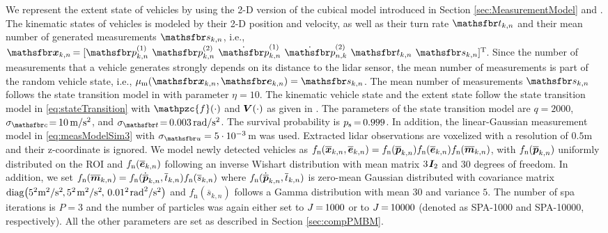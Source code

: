 \documentclass[10pt, twoside, romanappendices]{IEEEtran}
\providecommand{\ist}{\hspace*{.3mm}}
\providecommand{\rmv}{\hspace*{-.3mm}}
\begin{document}
We represent the extent state of vehicles by using the 2-D version of the cubical model introduced in Section \ref{sec:MeasurementModel} and \cite[Section 2]{MeyWil:SM21}. The kinematic states of vehicles is modeled by their  2-D position and velocity, as well as their turn rate $\rv{t}_{k,n}$ and their mean number of generated measurements $\rv{s}_{k,n}$, i.e., $\RV{x}_{k,n} \rmv= [\rv{p}^{(1)}_{k,n} \;\ist \rv{p}^{(2)}_{k,n} \;\ist \dot{\rv{p}}^{(1)}_{k,n} \;\ist \dot{\rv{p}}^{(2)}_{n,k} \;\ist \rv{t}_{k,n}  \;\ist \rv{s}_{k,n}  ]^{\text{T}}\rmv\rmv$. Since the number of measurements that a vehicle generates strongly depends on\vspace{0mm} its distance to the lidar sensor, the mean number of measurements is part of the random vehicle state, i.e., $\mu_{\mathrm{m}}(\RV{x}_{k,n},\RV{e}_{k,n}) = \rv{s}_{k,n}$. The mean number of measurements $\rv{s}_{k,n}$ follows the state transition model in \cite[Table III]{GraFatSve:J19} with parameter $\eta = 10$. The kinematic vehicle state and the extent state follow the state transition model in \eqref{eq:stateTransition} with $\mathpzc{f}(\cdot)$ and  $\M{V}(\cdot)$ as given in \cite{ GraOrg:J14a}. The parameters of the state transition model are  $q = 2000$, $\sigma_{\rv{c}} \!=\rmv 10 \ist\ist \text{m}/\text{s}^2$, and  $\sigma_{\rv{t}} \!=\rmv 0.003 \ist\ist \text{rad}/\text{s}^2$. The survival probability is $p_{\mathrm{s}} \rmv=\rmv 0.999$. In addition, the linear-Gaussian measurement model in \eqref{eq:measModelSim3} with $\sigma_{\rv{u}} = 5 \cdot 10^{-3}\ist$m was used. Extracted lidar observations are voxelized with a resolution of $0.5$m and their z-coordinate is ignored. We model newly detected vehicles as $f_{\mathrm{n}}(\overline{\bm{x}}_{k,n},\overline{\bm{e}}_{k,n})= f_{\mathrm{n}}(\overline{\bm{p}}_{k,n}) f_{\mathrm{n}}(\overline{\bm{e}}_{k,n})  f_{\mathrm{n}}(\overline{\bm{m}}_{k,n})$, with $f_{\mathrm{n}}(\overline{\bm{p}}_{k,n})$ uniformly distributed on the ROI and $f_{\mathrm{n}}(\overline{\bm{e}}_{k,n})$ following an inverse Wishart distribution with mean matrix $3 \ist \M{I}_2$ and $30$ degrees of freedom. In addition, we set $f_{\mathrm{n}}(\overline{\bm{m}}_{k,n}) = f_{\mathrm{n}}(\dot{\overline{\bm{p}}}_{k,n}, \overline{t}_{k,n}) f_{\mathrm{n}}(\overline{s}_{k,n})$ where $f_{\mathrm{n}}(\dot{\overline{\bm{p}}}_{k,n}, \overline{t}_{k,n})$ is zero-mean Gaussian distributed with covariance matrix $\mathrm{diag}\big(5^2 \text{m}^2/\text{s}^2\rmv, 5^2 \ist \text{m}^2/\text{s}^2\rmv, \ist\ist 0.01^2 \ist \text{rad}^2/\text{s}^2\big)$ and $f_{\mathrm{n}}(\overline{s}_{k,n})$ follows a Gamma distribution with mean $30$ and variance $5$. The number of \ac{spa} iterations is $P=3$ and the number of particles was again either set to $J\rmv=\rmv1000$ or to $J\rmv=\rmv10000$ (denoted as SPA-1000 and SPA-10000, respectively). All the other parameters are set as described in Section \ref{sec:compPMBM}.
\end{document}
